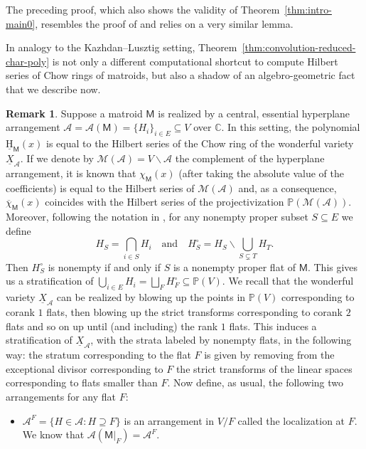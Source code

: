 \documentclass[11pt, a4paper, english]{amsart}
\theoremstyle{teoremas}
\theoremstyle{definition}
\newtheorem{remark}[theorem]{Remark}
\newcommand{\M}{\mathsf{M}}
\newcommand{\uH}{\underline{\mathrm{H}}}
\begin{document}
The preceding proof, which also shows the validity of Theorem~\ref{thm:intro-main0}, resembles the proof of \cite[Proposition~2.3]{proudfoot-xu-young} and relies on a very similar lemma. 

In analogy to the Kazhdan--Lusztig setting, Theorem~\ref{thm:convolution-reduced-char-poly} is not only a different computational shortcut to compute Hilbert series of Chow rings of matroids, but also a shadow of an algebro-geometric fact that we describe now. 

\begin{remark}
    Suppose a matroid $\M$ is realized by a central, essential hyperplane arrangement $\mathcal{A} = \mathcal{A}(\M) = \{H_i \}_{i \in E} \subseteq V$ over $\mathbb{C}$. In this setting, the polynomial $\uH_\M(x)$ is equal to the Hilbert series of the Chow ring of the wonderful variety $\underline{X}_\mathcal{A}$.
    If we denote by $\mathcal{M}(\mathcal{A}) = V \smallsetminus \mathcal{A}$ the complement of the hyperplane arrangement, it is known that $\chi_\M(x)$ (after taking the absolute value of the coefficients) is equal to the Hilbert series of $\mathcal{M}(\mathcal{A})$ and, as a consequence, $\overline{\chi}_\M(x)$ coincides with the Hilbert series of the projectivization $\mathbb{P}(\mathcal{M}(\mathcal{A}))$. 
    Moreover, following the notation in \cite[Section~1.5]{semismall}, for any nonempty proper subset $S \subseteq E$ we define
    \[
    H_S = \bigcap_{i \in S}H_i  \quad \text{and} \quad H_S^\circ = H_S \smallsetminus \bigcup_{S \subsetneq T} H_T.
    \]
    Then $H_S^\circ$ is nonempty if and only if $S$ is a nonempty proper flat of $\M$. This gives us a stratification of $\bigcup_{i \in E} H_i = \bigsqcup_{F}H_F^\circ \subseteq \mathbb{P}(V)$. We recall that the wonderful variety $\underline{X}_\mathcal{A}$ can be realized by blowing up the points in $\mathbb{P}(V)$ corresponding to corank $1$ flats, then blowing up the strict transforms corresponding to corank $2$ flats and so on up until (and including) the rank $1$ flats. This induces a stratification of $\underline{X}_\mathcal{A}$, with the strata labeled by nonempty flats, in the following way: the stratum corresponding to the flat $F$ is given by removing from the exceptional divisor corresponding to $F$ the strict transforms of the linear spaces corresponding to flats smaller than $F$.  
    Now define, as usual, the following two arrangements for any flat $F$:
    \begin{itemize} 
        \item $\mathcal{A}^F = \{H \in \mathcal{A} : H \supseteq F\}$ is an arrangement in $V/F$ called the localization at $F$. We know that $\mathcal{A}(\M|_F) = \mathcal{A}^F$.

\end{itemize}
\end{remark}
\end{document}
